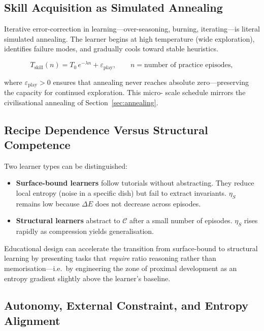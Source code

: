 \documentclass[12pt,a4paper]{article}
\theoremstyle{definition}
\begin{document}
\subsection{Skill Acquisition as Simulated Annealing}

Iterative error-correction in learning---over-seasoning, burning, iterating---is
literal simulated annealing.  The learner begins at high temperature
(wide exploration), identifies failure modes, and gradually cools toward stable
heuristics.

\begin{equation}
  T_{\mathrm{skill}}(n) = T_0\,e^{-\lambda n} + \varepsilon_{\mathrm{play}},
  \qquad n = \text{number of practice episodes},
\end{equation}

where $\varepsilon_{\mathrm{play}} > 0$ ensures that annealing never reaches
absolute zero---preserving the capacity for continued exploration.  This micro-
scale schedule mirrors the civilisational annealing of Section~\ref{sec:annealing}.

\subsection{Recipe Dependence Versus Structural Competence}

Two learner types can be distinguished:

\begin{itemize}[leftmargin=*]
  \item \textbf{Surface-bound learners} follow tutorials without abstracting.
    They reduce local entropy (noise in a specific dish) but fail to extract
    invariants.  $\eta_S$ remains low because $\Delta E$ does not decrease
    across episodes.
  \item \textbf{Structural learners} abstract to $\mathcal{C}$ after a small
    number of episodes.  $\eta_S$ rises rapidly as compression yields
    generalisation.
\end{itemize}

Educational design can accelerate the transition from surface-bound to
structural learning by presenting tasks that \emph{require} ratio reasoning
rather than memorisation---i.e.\ by engineering the zone of proximal
development as an entropy gradient slightly above the learner's baseline.

\subsection{Autonomy, External Constraint, and Entropy Alignment}
\end{document}

